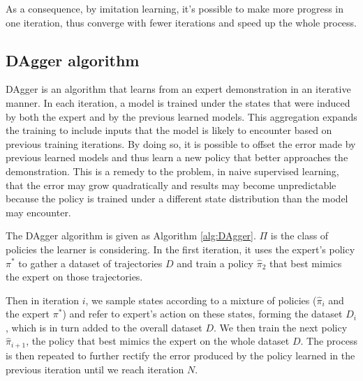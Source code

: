 \documentclass[twoside,11pt]{article}
\begin{document}
As a consequence, by imitation learning, it's possible to make more progress in one iteration, thus converge with fewer iterations and speed up the whole process.  







\subsection{DAgger algorithm}
DAgger is an algorithm that learns from an expert demonstration in an iterative manner. In each iteration, a model is trained under the states that were induced by both the expert and by the previous learned models. This aggregation expands the training to include inputs that the model is likely to encounter based on previous training iterations. By doing so, it is possible to offset the error made by previous learned models and thus learn a new policy that better approaches the demonstration. This is a remedy to the problem, in naive supervised learning, that the error may grow quadratically and results may become unpredictable because the policy is trained under a different state distribution than the model may encounter. 


The DAgger algorithm is given as Algorithm \ref{alg:DAgger}. $\Pi$ is the class of policies the learner is considering.
In the first iteration, it uses the expert's policy $\pi^*$ to gather
a dataset of trajectories $D$ and train a policy $\hat{\pi}_2$ that best mimics the expert on those trajectories. 

Then in iteration $i$, we sample states according to a mixture of policies ($\hat{\pi}_i$ and the expert $\pi^*$) and refer to expert's action on these states, forming the dataset $D_i$, which is in turn added to the overall dataset $D$. We then train the next policy $\hat{\pi}_{i+1}$, the policy that best mimics the expert on the whole dataset $D$. The process is then repeated to further rectify the error produced by the policy learned in the previous iteration until we reach iteration $N$.
\end{document}
